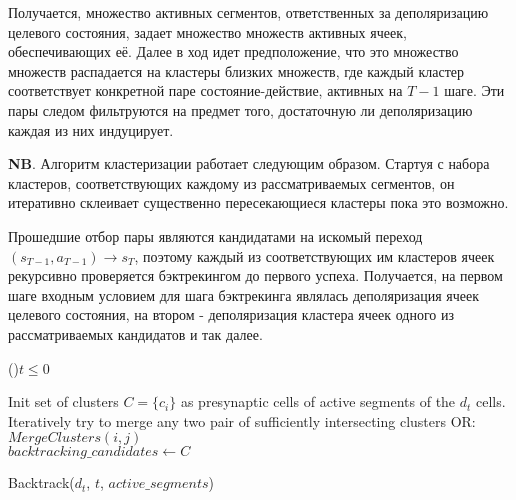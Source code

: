 \documentclass[a4paper]{article}
\begin{document}
Получается, множество активных сегментов, ответственных за деполяризацию целевого состояния, задает множество множеств активных ячеек, обеспечивающих её. Далее в ход идет предположение, что это множество множеств распадается на кластеры близких множеств, где каждый кластер соответствует конкретной паре состояние-действие, активных на $T-1$ шаге. Эти пары следом фильтруются на предмет того, достаточную ли деполяризацию каждая из них индуцирует.

\textbf{NB}. Алгоритм кластеризации работает следующим образом. Стартуя с набора кластеров, соответствующих каждому из рассматриваемых сегментов, он итеративно склеивает существенно пересекающиеся кластеры пока это возможно.

Прошедшие отбор пары являются кандидатами на искомый переход $(s_{T-1}, a_{T-1}) \rightarrow s_T$, поэтому каждый из соответствующих им кластеров ячеек рекурсивно проверяется бэктрекингом до первого успеха. Получается, на первом шаге входным условием для шага бэктрекинга являлась деполяризация ячеек целевого состояния, на втором - деполяризация кластера ячеек одного из рассматриваемых кандидатов и так далее.

\begin{function}
  \If(){$t \leq 0$} {
  }{}

  Init set of clusters $C = \{c_i\}$ as presynaptic cells of active segments of the $d_t$ cells. \;
  Iteratively try to merge any two pair of sufficiently intersecting clusters \;
  OR: \;
   {
    $MergeClusters(i, j)$ 
  }
  \quad \\

  $backtracking\_candidates \leftarrow C$ \;

  \caption{Backtrack($d_t$, $t$, $active\_segments$)}
\end{function}
\end{document}
